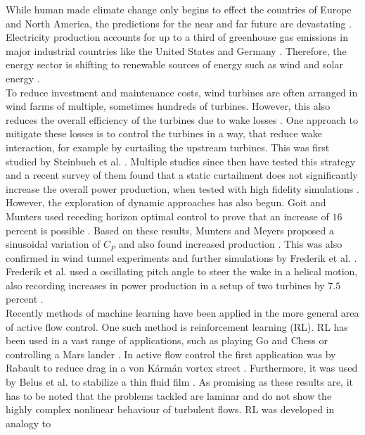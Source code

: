
While human made climate change only begins to effect the countries of Europe and North America, the predictions for the near and far future are devastating \cite{hoegh-guldberg_impacts_2019}. Electricity production accounts for up to a third of greenhouse gas emissions in major industrial countries like the United States \cite{hockstad_inventory_2018} and Germany \cite{ortl_entwicklung_2020}. Therefore, the energy sector is shifting to renewable sources of energy such as wind and solar energy \cite{international_energy_agency_global_2020}.\\
To reduce investment and maintenance costs, wind turbines are often arranged in wind farms of multiple, sometimes hundreds of turbines. However, this also reduces the overall efficiency of the turbines due to wake losses \cite{nilsson_large-eddy_2015}. One approach to mitigate these losses is to control the turbines in a way, that reduce wake interaction, for example by curtailing the upstream turbines. This was first studied by Steinbuch et al. \cite{steinbuch_optimal_1988}. Multiple studies since then have tested this strategy and a recent survey of them found that a static curtailment does not significantly increase the overall power production, when tested with high fidelity simulations \cite{kheirabadi_quantitative_2019}. However, the exploration of dynamic approaches has also begun. Goit and Munters used receding horizon optimal control to prove that an increase of $16$ percent is possible \cite{goit_optimal_2015}. Based on these results, Munters and Meyers proposed a sinusoidal variation of $C_P$ and also found increased production \cite{munters_towards_2018}. This was also confirmed in wind tunnel experiments and further simulations by Frederik et al. \cite{frederik_periodic_2020}. Frederik et al. used a oscillating pitch angle to steer the wake in a helical motion, also recording increases in power production in a setup of two turbines by $7.5$ percent \cite{frederik_helix_2020}. \\
Recently methods of machine learning have been applied in the more general area of active flow control. One such method is reinforcement learning (RL). RL has been used in a vast range of applications, such as playing Go and Chess \cite{silver_general_2018} or controlling a Mars lander  \cite{gaudet_deep_2020}. In active flow control the first application was by Rabault to reduce drag in a von Kármán vortex street \cite{rabault_artificial_2019}. Furthermore, it was used by Belus et al. to stabilize a thin fluid film \cite{belus_exploiting_2019}. As promising as these results are, it has to be noted that the problems tackled are laminar and do not show the highly complex nonlinear behaviour of turbulent flows. RL was developed in analogy to \\
